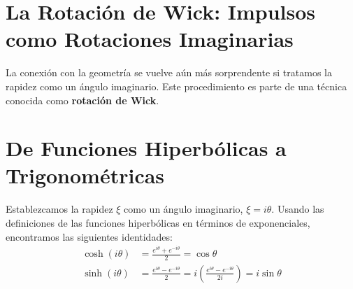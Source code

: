 \documentclass[11pt,a4paper]{book}
\begin{document}
\section{La Rotación de Wick: Impulsos como Rotaciones Imaginarias}

La conexión con la geometría se vuelve aún más sorprendente si tratamos la rapidez como un ángulo imaginario. Este procedimiento es parte de una técnica conocida como \textbf{rotación de Wick}.

\section{De Funciones Hiperbólicas a Trigonométricas}
Establezcamos la rapidez $\xi$ como un ángulo imaginario, $\xi = i\theta$. Usando las definiciones de las funciones hiperbólicas en términos de exponenciales, encontramos las siguientes identidades:
\begin{align*}
    \cosh(i\theta) &= \frac{e^{i\theta} + e^{-i\theta}}{2} = \cos\theta \\
    \sinh(i\theta) &= \frac{e^{i\theta} - e^{-i\theta}}{2} = i \left( \frac{e^{i\theta} - e^{-i\theta}}{2i} \right) = i\sin\theta
\end{align*}
\end{document}
